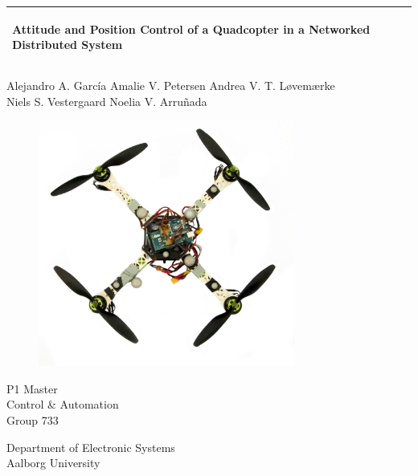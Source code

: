 %
\begin{titlepage}
  \addtolength{\hoffset}{0.5\evensidemargin-0.5\oddsidemargin} %
  \noindent%
  \begin{tabular}{@{}p{\textwidth}@{}}
    \toprule[2pt]
    \midrule
    \vspace{0.2cm}
    \begin{center}
    \Huge{\textbf{
      Attitude and Position Control of a Quadcopter in a Networked Distributed System}}
    \end{center}
	\vspace{0.2cm} \\
    \midrule
    \toprule[2pt]
  \end{tabular}
   \centering
   \vspace{0.25 cm}
  {
 Alejandro A. García \hspace{0.6 cm} Amalie V. Petersen \hspace{0.6 cm} Andrea V. T. Løvemærke\\

 Niels S. Vestergaard \hspace{0.6 cm}Noelia V. Arruñada}
  \vspace{0 cm}
  \begin{figure}[!ht]
\centering
\includegraphics[width=0.75\textwidth]{figures/quadcopter}
\label{fig:forside}
\end{figure}
  \vspace{-1 cm}
  \begin{center}
    {\large 
    P1 Master\\
      Control \& Automation\\
      Group 733 %
    }
    \vspace{0.1cm}
    {\Large
    }
  \end{center}
  \begin{center}
  Department of Electronic Systems\\
  Aalborg University
  \end{center}
\end{titlepage}

\clearpage